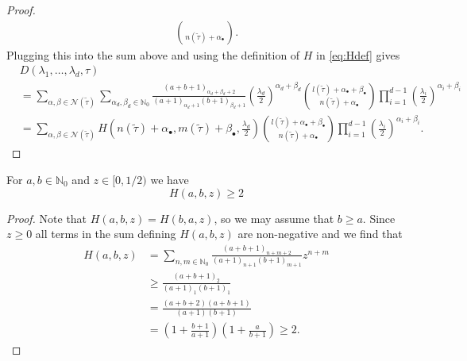 \documentclass[10pt,twoside,a4paper]{amsart}
\begin{document}
\begin{proof}
\begin{align*}
{    \choose n(\tilde{\tau}) + \alpha_{\bullet}}.
\end{align*}
Plugging this into the sum above and using the definition of $H$ in \eqref{eq:Hdef} gives
{\small 
\begin{align*}
    & D(\lambda_1, \ldots, \lambda_{d}, \tau)  \\ & = 
    \sum_{\alpha, \beta \in \mathcal{N}(\tilde{\tau})} \sum_{\alpha_d, \beta_d \in \mathbb{N}_0}
    \frac{(a + b + 1)_{\alpha_d + \beta_d + 2}}{(a + 1)_{\alpha_d + 1}(b + 1)_{\beta_d + 1}} \left(\frac{\lambda_d}{2}\right)^{\alpha_d + \beta_d}
    {l(\tilde{\tau}) + \alpha_{\bullet} + \beta_{\bullet}
    \choose n(\tilde{\tau}) + \alpha_{\bullet}} 
    \prod_{i=1}^{d-1} \left(\frac{\lambda_i}{2}\right)^{\alpha_i + \beta_i}
    \\
    & = 
    \sum_{\alpha, \beta \in \mathcal{N}(\tilde{\tau})} 
    H\left(n(\tilde{\tau}) + \alpha_{\bullet}, m(\tilde{\tau}) + \beta_{\bullet}, \frac{\lambda_d}{2}\right) 
    {l(\tilde{\tau}) + \alpha_{\bullet} + \beta_{\bullet}
    \choose n(\tilde{\tau}) + \alpha_{\bullet}}
    \prod_{i=1}^{d-1} \left(\frac{\lambda_i}{2}\right)^{\alpha_i + \beta_i}. 
\end{align*}
}
\end{proof}

\begin{lemma} \label{lem:2bound}
    For $a,b \in \mathbb{N}_0$ and $z \in [0, 1/2)$ we have
    \begin{equation}
        H(a, b, z) \geq 2
    \end{equation}    
\end{lemma}

\begin{proof} Note that $H(a, b, z) = H(b, a, z)$, so we may assume that $b \geq a$.
    Since $z \geq 0$ all terms in the sum defining $H(a, b, z)$ are non-negative and 
    we find that
    \begin{align*}
        H(a, b, z) & = \sum_{n, m \in \mathbb{N}_0}
        \frac{(a + b + 1)_{n + m + 2}}{(a + 1)_{n + 1}(b + 1)_{m + 1}}
        z^{n + m} \\
        & \geq \frac{(a + b + 1)_{2}}{(a + 1)_{1}(b + 1)_{1}} \\
        & = \frac{(a + b + 2)(a + b + 1)}{(a + 1)(b + 1)} \\
        & = \left(1 + \frac{b + 1}{a + 1}\right)
        \left( 1 + \frac{a}{b + 1} \right)  \geq 2.
    \end{align*}
\end{proof}
\end{document}
